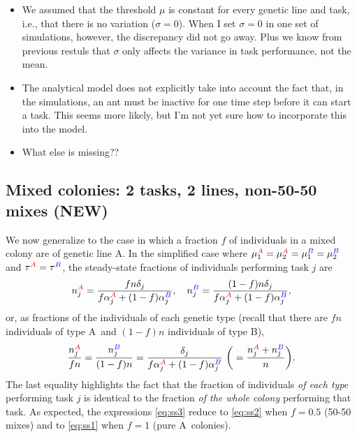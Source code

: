 \documentclass[10pt]{article}
\newcommand{\A}{{\color{red}A}}
\newcommand{\B}{{\color{blue}B}}
\begin{document}
\begin{itemize}
    \item We assumed that the threshold $\mu$ is constant for every genetic line and task, i.e., that there is no variation ($\sigma = 0$). {\color{orange}When I set $\sigma = 0$ in one set of simulations, however, the discrepancy did not go away. Plus we know from previous restuls that $\sigma$ only affects the variance in task performance, not the mean.}
    
    \item The analytical model does not explicitly take into account the fact that, in the simulations, an ant must be inactive for one time step before it can start a task. {\color{orange}This seems more likely, but I'm not yet sure how to incorporate this into the model.}
    
    \item {\color{orange}What else is missing??}
    
\end{itemize}

\subsection{Mixed colonies: 2 tasks, 2 lines, non-50-50 mixes (NEW)}

We now generalize to the case in which a fraction $f$ of individuals in a mixed colony are of genetic line \A. In the simplified case where $\mu_1^{\A} = \mu_2^{\A} = \mu_1^{\B} = \mu_2^{\B}$ and $\tau^{\A} = \tau^{\B}$, the steady-state fractions of individuals performing task $j$ are
\begin{equation}
     n_j^{\A} =  \frac{fn\delta_j}{f\alpha_j^{\A} + (1-f)\alpha_j^{\B}}, 
     \quad
     n_j^{\B} =  \frac{(1-f)n\delta_j}{f\alpha_j^{\A} + (1-f)\alpha_j^{\B}}, 
     \label{eq:ss3a}
\end{equation}
or, as fractions of the individuals of each genetic type (recall that there are $fn$ individuals of type \A\ and $(1-f)n$ individuals of type \B),
\begin{equation}
     \frac{n_j^{\A}}{fn} =  \frac{n_j^{\B}}{(1-f)n} = \frac{\delta_j}{f\alpha_j^{\A} + (1-f)\alpha_j^{\B}} \ \bigg(= \frac{n_j^{\A} + n_j^{\B}}{n}\bigg). \label{eq:ss3}
\end{equation}
The last equality highlights the fact that the fraction of individuals \textit{of each type} performing task $j$ is identical to the fraction \textit{of the whole colony} performing that task. As expected, the expressions \eqref{eq:ss3} reduce to \eqref{eq:ss2} when $f=0.5$ (50-50 mixes) and to \eqref{eq:ss1} when $f=1$ (pure \A\ colonies).
\end{document}
